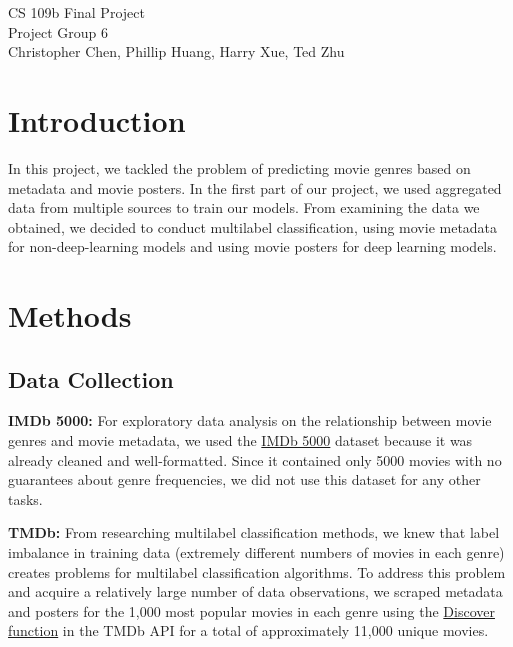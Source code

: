 \documentclass{article}
\begin{document}
\thispagestyle{empty} %

\begin{center}
    \LARGE{CS 109b Final Project} \\
    \smallskip
    \normalsize{Project Group 6} \\
    \normalsize{Christopher Chen, Phillip Huang, Harry Xue, Ted Zhu}
\end{center}

\section{Introduction}
\indent

In this project, we tackled the problem of predicting movie genres based on metadata and movie posters. In the first part of our project, we used aggregated data from multiple sources to train our models. From examining the data we obtained, we decided to conduct multilabel classification, using movie metadata for non-deep-learning models and using movie posters for deep learning models.

\section{Methods}
    \subsection{Data Collection}
        
        \indent
        
        \textbf{IMDb 5000:}
        For exploratory data analysis on the relationship between movie genres and movie metadata, we used the \href{https://www.kaggle.com/deepmatrix/imdb-5000-movie-dataset}{IMDb 5000} dataset because it was already cleaned and well-formatted. Since it contained only 5000 movies with no guarantees about genre frequencies, we did not use this dataset for any other tasks.
        
        \textbf{TMDb:}
        From researching multilabel classification methods, we knew that label imbalance in training data (extremely different numbers of movies in each genre) creates problems for multilabel classification algorithms. 
        To address this problem and acquire a relatively large number of data observations, we scraped metadata and posters for the 1,000 most popular movies in each genre using the \href{https://developers.themoviedb.org/3/discover}{Discover function} in the TMDb API for a total of approximately 11,000 unique movies.
        
\end{document}
